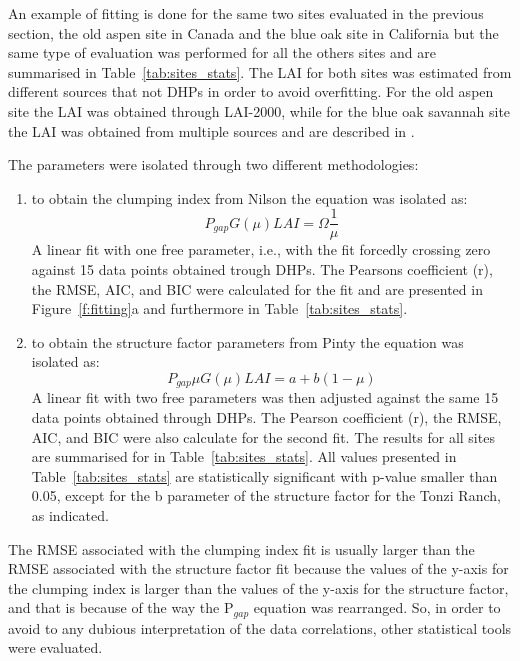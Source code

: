 An example of fitting is done for the same two sites evaluated in the previous section, the old aspen site in Canada and the blue oak site in California but the same type of evaluation was performed for all the others sites and are summarised in Table~\ref{tab:sites_stats}. The LAI for both sites was estimated from different sources that not DHPs in order to avoid overfitting. For the old aspen site the LAI was obtained through LAI-2000, while for the blue oak savannah site the LAI was obtained from multiple sources and are described in \citet{Ryu2010}.

The parameters were isolated through two different methodologies:
\begin{enumerate}
 \item to obtain the clumping index from Nilson the equation was isolated as:
\begin{equation}
P_{gap} G(\mu) LAI = \Omega \frac{1}{\mu}
\end{equation}\label{eq:isol_nilson}
A linear fit with one free parameter, i.e., with the fit forcedly crossing zero against 15 data points obtained trough DHPs. The Pearson\textquotesingle s coefficient (r), the RMSE, AIC, and BIC were calculated for the fit and are presented in Figure~\ref{f:fitting}a and furthermore in Table~\ref{tab:sites_stats}. 
 \item to obtain the structure factor parameters from Pinty the equation was isolated as:
\begin{equation}
P_{gap} \mu G(\mu) LAI = a + b (1 - \mu) 
\end{equation}\label{eq:isol_pinty}
A linear fit with two free parameters was then adjusted against the same 15 data points obtained through DHPs. The Pearson coefficient (r), the RMSE, AIC, and BIC were also calculate for the second fit. The results for all sites are summarised for in Table~\ref{tab:sites_stats}. All values presented in Table~\ref{tab:sites_stats} are statistically significant with p-value smaller than 0.05, except for the b parameter of the structure factor for the Tonzi Ranch, as indicated. 
\end{enumerate}

The RMSE associated with the clumping index fit is usually larger than the RMSE associated with the structure factor fit because the values of the y-axis for the clumping index is larger than the values of the y-axis for the structure factor, and that is because of the way the P$_{gap}$ equation was rearranged. So, in order to avoid to any dubious interpretation of the data correlations, other statistical tools were evaluated.

